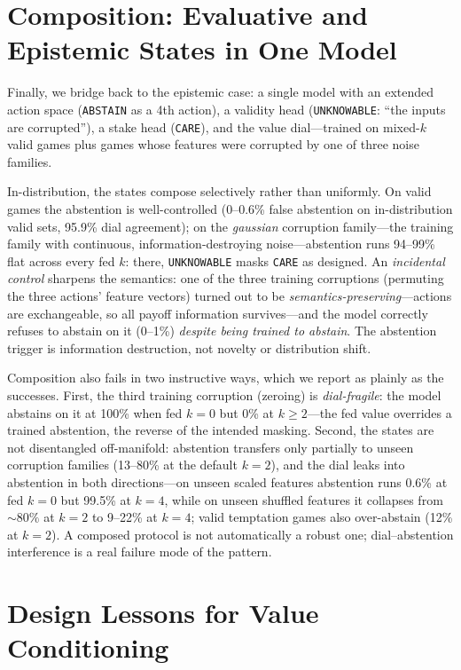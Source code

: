\documentclass[11pt]{article}
\newcommand{\care}{\texttt{CARE}}
\newcommand{\unknown}{\texttt{UNKNOWABLE}}
\newcommand{\abstain}{\texttt{ABSTAIN}}
\begin{document}
\section{Composition: Evaluative and Epistemic States in One Model}
\label{sec:composition}

Finally, we bridge back to the epistemic case: a single model with an extended action space (\abstain{} as a 4th action), a validity head (\unknown{}: ``the inputs are corrupted''), a stake head (\care{}), and the value dial---trained on mixed-$k$ valid games plus games whose features were corrupted by one of three noise families.

In-distribution, the states compose selectively rather than uniformly. On valid games the abstention is well-controlled (0--0.6\% false abstention on in-distribution valid sets, 95.9\% dial agreement); on the \emph{gaussian} corruption family---the training family with continuous, information-destroying noise---abstention runs 94--99\% flat across every fed $k$: there, \unknown{} masks \care{} as designed. An \emph{incidental control} sharpens the semantics: one of the three training corruptions (permuting the three actions' feature vectors) turned out to be \emph{semantics-preserving}---actions are exchangeable, so all payoff information survives---and the model correctly refuses to abstain on it (0--1\%) \emph{despite being trained to abstain}. The abstention trigger is information destruction, not novelty or distribution shift.

Composition also fails in two instructive ways, which we report as plainly as the successes. First, the third training corruption (zeroing) is \emph{dial-fragile}: the model abstains on it at 100\% when fed $k{=}0$ but 0\% at $k\geq 2$---the fed value overrides a trained abstention, the reverse of the intended masking. Second, the states are not disentangled off-manifold: abstention transfers only partially to unseen corruption families (13--80\% at the default $k{=}2$), and the dial leaks into abstention in both directions---on unseen scaled features abstention runs 0.6\% at fed $k{=}0$ but 99.5\% at $k{=}4$, while on unseen shuffled features it collapses from ${\sim}80\%$ at $k{=}2$ to 9--22\% at $k{=}4$; valid temptation games also over-abstain (12\% at $k{=}2$). A composed protocol is not automatically a robust one; dial--abstention interference is a real failure mode of the pattern.

\section{Design Lessons for Value Conditioning}
\label{sec:lessons}
\end{document}
